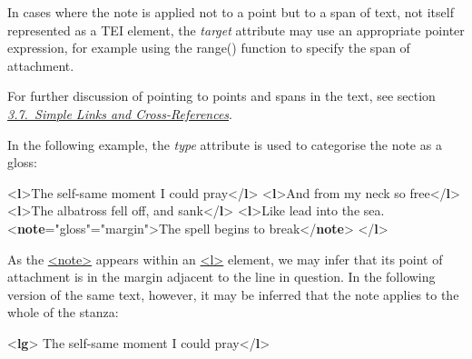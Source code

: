In cases where the note is applied not to a point but to a span of text, not itself represented as a TEI element, the {\itshape target} attribute may use an appropriate pointer expression, for example using the \textsf{range()} function to specify the span of attachment.\par
For further discussion of pointing to points and spans in the text, see section \textit{\hyperref[COXR]{3.7.\ Simple Links and Cross-References}}.\par
In the following example, the {\itshape type} attribute is used to categorise the note as a gloss: \par\bgroup{}\exampleFont \begin{shaded}\noindent\mbox{}{<\textbf{l}>}The self-same moment I could pray{</\textbf{l}>}\mbox{}\newline 
{<\textbf{l}>}And from my neck so free{</\textbf{l}>}\mbox{}\newline 
{<\textbf{l}>}The albatross fell off, and sank{</\textbf{l}>}\mbox{}\newline 
{<\textbf{l}>}Like lead into the sea.\mbox{}\newline 
{<\textbf{note}\hspace*{1em}{type}="{gloss}"\hspace*{1em}{place}="{margin}">}The spell begins to break{</\textbf{note}>}\mbox{}\newline 
{</\textbf{l}>}\end{shaded}\egroup\par \noindent  As the \hyperref[TEI.note]{<note>} appears within an \hyperref[TEI.l]{<l>} element, we may infer that its point of attachment is in the margin adjacent to the line in question. In the following version of the same text, however, it may be inferred that the note applies to the whole of the stanza: \par\bgroup{}\exampleFont \begin{shaded}\noindent\mbox{}{<\textbf{lg}>}\mbox{}\newline 
{}The self-same moment I could pray{</\textbf{l}>}\mbox{}\newline 

\end{shaded}
